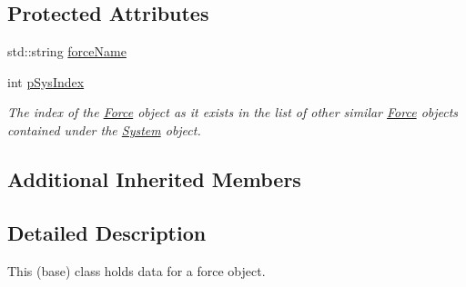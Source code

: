 \subsection*{Protected Attributes}
\begin{DoxyCompactItemize}
\item 
std\-::string \hyperlink{classosea_1_1ofreq_1_1_force_af7cab6c2ebbe013f407570136a5cb8e7}{force\-Name}
\item 
\hypertarget{classosea_1_1ofreq_1_1_force_ae93d98d3c25ed841450d2a839b936aad}{int \hyperlink{classosea_1_1ofreq_1_1_force_ae93d98d3c25ed841450d2a839b936aad}{p\-Sys\-Index}}\label{classosea_1_1ofreq_1_1_force_ae93d98d3c25ed841450d2a839b936aad}

\begin{DoxyCompactList}\small\item\em The index of the \hyperlink{classosea_1_1ofreq_1_1_force}{Force} object as it exists in the list of other similar \hyperlink{classosea_1_1ofreq_1_1_force}{Force} objects contained under the \hyperlink{classosea_1_1ofreq_1_1_system}{System} object. \end{DoxyCompactList}\end{DoxyCompactItemize}
\subsection*{Additional Inherited Members}


\subsection{Detailed Description}
This (base) class holds data for a force object. 

